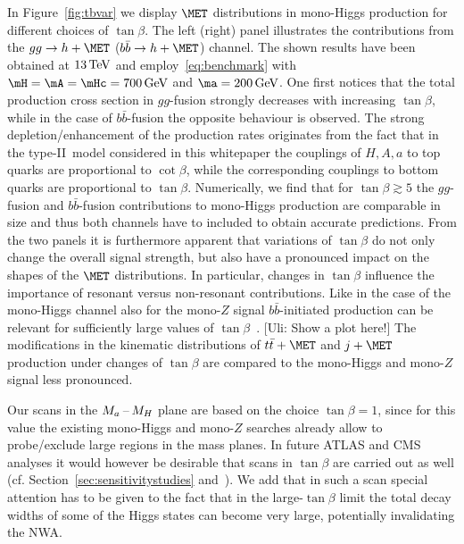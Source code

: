 In Figure~\ref{fig:tbvar} we display $\MET$ distributions in mono-Higgs production for different choices of $\tan \beta$. The left (right) panel illustrates the contributions from the $gg \to h + \MET$ ($b \bar b \to h + \MET$) channel. The shown results have been obtained at $13 \, {\rm TeV}$ and employ~\eqref{eq:benchmark} with $\mH = \mA = \mHc = 700 \, {\rm GeV}$ and $\ma = 200 \, {\rm GeV}$. One first notices that the total production cross section in $gg$-fusion strongly decreases with increasing $\tan \beta$, while in the case of $b \bar b$-fusion the opposite behaviour is observed. The strong depletion/enhancement of the production rates originates from the fact that in  the type-II~\hdma model considered in this whitepaper the couplings of $H,A,a$ to top quarks are proportional to $\cot \beta$, while the corresponding couplings to bottom quarks are proportional to $\tan \beta$. Numerically, we find that for $\tan \beta \gtrsim 5$ the $gg$-fusion and $b\bar b$-fusion contributions to mono-Higgs production are comparable in size and thus both channels have to included to obtain accurate predictions. From the two panels it is furthermore apparent that variations of $\tan \beta$ do not only change the overall signal strength, but also have a pronounced impact on the shapes of the $\MET$ distributions. In particular, changes in $\tan \beta$ influence the importance of resonant versus non-resonant contributions. Like in the case of the mono-Higgs channel also for the mono-$Z$ signal $b \bar b$-initiated production can be relevant for sufficiently large values of $\tan \beta$~\cite{Bauer:2017ota}. {\color{red} [Uli: Show a plot here!]} The modifications in the kinematic distributions of $t \bar t + \MET$ and $j +\MET$ production under changes of $\tan \beta$ are compared to the mono-Higgs and mono-$Z$ signal less pronounced. 

Our  scans in the $M_{a}\hspace{0.5mm}$--$\hspace{0.5mm} M_H$ plane are based on the choice $\tan \beta = 1$, since for this value the existing mono-Higgs and mono-$Z$ searches already allow to probe/exclude large regions in the mass planes. In  future ATLAS and CMS analyses it would however be desirable that scans in $\tan \beta$ are carried out as well (cf. Section~\ref{sec:sensitivitystudies} and~\cite{No:2015xqa,Bauer:2017ota,Pani:2017qyd}). We add that in such a scan special attention has to be given to the fact that in the large-$\tan \beta$ limit the total decay widths of some of the Higgs states can become very large, potentially invalidating the NWA.

